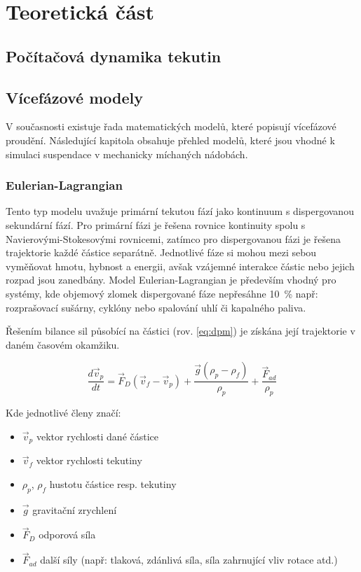 \chapter{Teoretická část}



\section{Počítačová dynamika tekutin}

\section{Vícefázové modely}
V současnosti existuje řada matematických modelů, které popisují vícefázové proudění. Následující kapitola obsahuje přehled modelů, které jsou vhodné k simulaci suspendace v mechanicky míchaných nádobách.

\subsection{Eulerian-Lagrangian}
Tento typ modelu uvažuje primární tekutou fází jako kontinuum s dispergovanou sekundární fází. Pro primární fázi je řešena rovnice kontinuity spolu s Navierovými-Stokesovými rovnicemi, zatímco pro dispergovanou fázi je řešena trajektorie každé částice separátně. Jednotlivé fáze si mohou mezi sebou vyměňovat hmotu, hybnost a energii, avšak vzájemné interakce částic nebo jejich rozpad jsou zanedbány. Model Eulerian-Lagrangian je především vhodný pro systémy, kde objemový zlomek dispergované fáze nepřesáhne \SI{10}{\percent} např: rozprašovací sušárny, cyklóny nebo spalování uhlí či kapalného paliva. 

Řešením bilance sil působící na částici (rov. \ref{eq:dpm}) je získána její trajektorie v daném časovém okamžiku.

\begin{equation}
	\frac{d\vec{v}_{p}}{dt} = \vec{F}_{D}(\vec{v}_{f} - \vec{v}_{p}) + \frac{\vec{g}(\rho_{p} - \rho_{f})}{\rho_{p}} + \frac{\vec{F}_{ad}}{\rho_{p}}
	\label{eq:dpm}
\end{equation} 

\noindent Kde jednotlivé členy značí:

\begin{itemize}[itemsep=0pt,parsep=0pt,partopsep=0pt,topsep=0pt]
  \item $\vec{v}_{p}$ vektor rychlosti dané částice
  \item $\vec{v}_{f}$ vektor rychlosti tekutiny
  \item $\rho_{p}$, $\rho_{f}$ hustotu částice resp. tekutiny
  \item $\vec{g}$ gravitační zrychlení
  \item $\vec{F}_{D}$ odporová síla
  \item $\vec{F}_{ad}$ další síly (např: tlaková, zdánlivá síla, síla zahrnující vliv rotace atd.)
\end{itemize}

